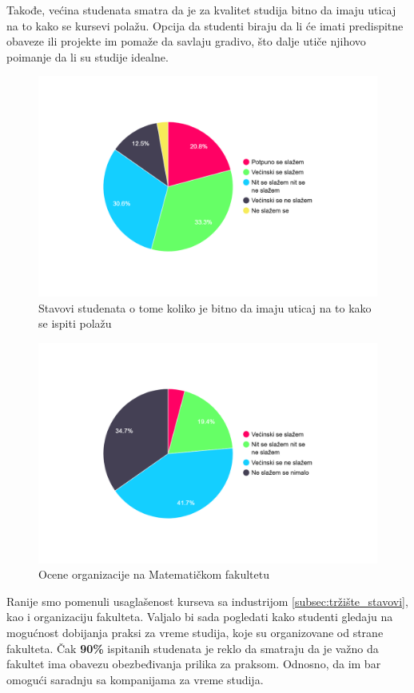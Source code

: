 \documentclass[a4paper]{article}
\begin{document}
{Takođe, većina studenata smatra da je za kvalitet studija bitno da imaju uticaj na to kako se kursevi polažu. Opcija da studenti biraju da li će imati predispitne obaveze ili projekte im pomaže da savlaju gradivo, što dalje utiče njihovo poimanje da li su studije idealne.
\begin{figure}[h!]
\begin{center}
    \includegraphics[width=0.7\linewidth]{Slike/PieChartNacinPolaganja.png}
    \caption{Stavovi studenata o tome koliko je bitno da imaju uticaj na to kako se ispiti polažu}
    \label{fig:uticaj}
\end{center}
\end{figure}


\begin{figure}[h!]
\begin{center}
    \includegraphics[width=0.7\linewidth]{Slike/PieChartOrganizacijaMatfa.png}
    \caption{Ocene organizacije na Matematičkom fakultetu}
    \label{fig:organizacija_matf}
\end{center}
\end{figure}

Ranije smo pomenuli usaglašenost kurseva sa industrijom \ref{subsec:tržište_stavovi}, kao i organizaciju fakulteta. Valjalo bi sada pogledati kako studenti gledaju na mogućnost dobijanja praksi za vreme studija, koje su organizovane od strane fakulteta. Čak \textbf{90\%} ispitanih studenata je reklo da smatraju da je važno da fakultet ima obavezu obezbeđivanja prilika za praksom. Odnosno, da im bar omogući saradnju sa kompanijama za vreme studija.

}
\end{document}
